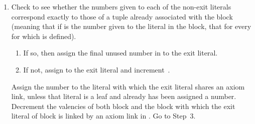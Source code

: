 \documentclass{LMCS}
\theoremstyle{plain}\newtheorem*{cLm}{Claim}
\begin{document}
\begin{enumerate}
\begin{enumerate}
    \end{enumerate}
  \item Check to see whether the numbers given to each of the non-exit
    literals correspond exactly to those of a tuple  already associated with the block
    (meaning that if  is the number given to the 
    literal in the block, that  for every  for which
     is defined).
    \begin{enumerate}
    \item If so, then assign the final unused number in  to
      the exit literal.
    \item If not, assign  to the exit literal and increment~.
    \end{enumerate}
    Assign the number to the literal with which the exit literal shares
    an axiom link, unless that literal is a leaf and already has been
    assigned a number. Decrement the valencies of both block  and
    the block with which the exit literal of block  is linked by an
    axiom link in . Go to Step~3.
  \end{enumerate}
  
\end{document}
